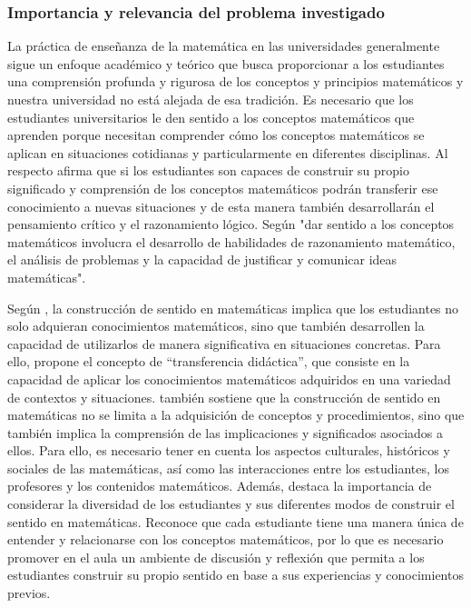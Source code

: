 \subsubsection{Importancia y relevancia del problema investigado}

La práctica de enseñanza de la matemática en las universidades generalmente sigue un enfoque académico y teórico que busca proporcionar a los estudiantes una comprensión profunda y rigurosa de los conceptos y principios matemáticos y nuestra universidad no está alejada de esa tradición. Es necesario que los estudiantes universitarios le den sentido a los conceptos matemáticos que aprenden porque necesitan comprender cómo los conceptos matemáticos se aplican en situaciones cotidianas y particularmente en diferentes disciplinas. Al respecto \textcite{brousseau2007} afirma que si los estudiantes son capaces de construir su propio significado y comprensión de los conceptos matemáticos podrán transferir ese conocimiento a nuevas situaciones y de esta manera también desarrollarán el pensamiento crítico y el razonamiento lógico. Según \textcite{lesh1992} "dar sentido a los conceptos matemáticos involucra el desarrollo de habilidades de razonamiento matemático, el análisis de problemas y la capacidad de justificar y comunicar ideas matemáticas".

Según \textcite{chevallard1999-11}, la construcción de sentido en matemáticas implica que los estudiantes no solo adquieran conocimientos matemáticos, sino que también desarrollen la capacidad de utilizarlos de manera significativa en situaciones concretas. Para ello, propone el concepto de ``transferencia didáctica'', que consiste en la capacidad de aplicar los conocimientos matemáticos adquiridos en una variedad de contextos y situaciones. \textcite{chevallard2007} también sostiene que la construcción de sentido en matemáticas no se limita a la adquisición de conceptos y procedimientos, sino que también implica la comprensión de las implicaciones y significados asociados a ellos. Para ello, es necesario tener en cuenta los aspectos culturales, históricos y sociales de las matemáticas, así como las interacciones entre los estudiantes, los profesores y los contenidos matemáticos. Además, destaca la importancia de considerar la diversidad de los estudiantes y sus diferentes modos de construir el sentido en matemáticas. Reconoce que cada estudiante tiene una manera única de entender y relacionarse con los conceptos matemáticos, por lo que es necesario promover en el aula un ambiente de discusión y reflexión que permita a los estudiantes construir su propio sentido en base a sus experiencias y conocimientos previos.

